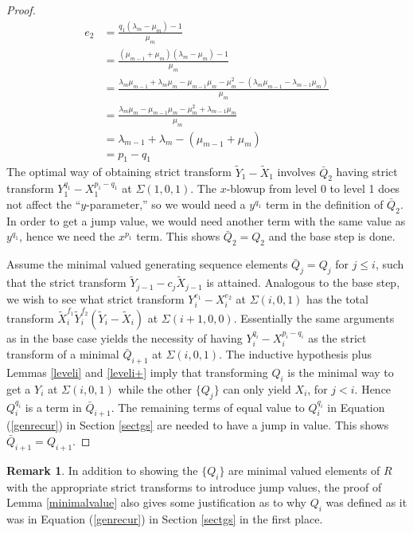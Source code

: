 \documentclass[11pt]{amsart}
\theoremstyle{definition}
\newtheorem*{rem}{Remark}
\begin{document}
{\begin{proof}
\begin{equation*}
\begin{array}{rl}
e_2 & \displaystyle =\frac{q_1(\lambda_m-\mu_m)-1}{\mu_m} \\
& \displaystyle = \frac{(\mu_{m-1}+\mu_m)(\lambda_m-\mu_m)-1}{\mu_m} \\
& \displaystyle = \frac{\lambda_m\mu_{m-1}+\lambda_m\mu_m-\mu_{m-1}\mu_m-\mu_m^2-(\lambda_m\mu_{m-1}-\lambda_{m-1}\mu_m)}{\mu_m} \\
& \displaystyle = \frac{\lambda_m\mu_m-\mu_{m-1}\mu_m-\mu_m^2+\lambda_{m-1}\mu_m}{\mu_m} \\
& \displaystyle = \lambda_{m-1}+\lambda_m - (\mu_{m-1}+\mu_m) \\
& \displaystyle = p_1 - q_1
\end{array}
\end{equation*}
The optimal way of obtaining strict transform $\tilde Y_1-\tilde X_1$ involves $\bar Q_2$ having strict transform $Y_1^{q_1}-X_1^{p_1-q_1}$ at $\Sigma(1,0,1)$. The $x$-blowup from level 0 to level 1 does not affect the ``$y$-parameter,'' so we would need a $y^{q_1}$ term in the definition of $\bar Q_2$. In order to get a jump value, we would need another term with the same value as $y^{q_1}$, hence we need the $x^{p_1}$ term. This shows $\bar Q_2=Q_2$ and the base step is done.

Assume the minimal valued generating sequence elements $\bar Q_j=Q_j$ for $j\leq i$, such that the strict transform $\tilde Y_{j-1}-c_j\tilde X_{j-1}$ is attained. Analogous to the base step, we wish to see what strict transform $Y_i^{e_1}-X_i^{e_2}$ at $\Sigma(i,0,1)$ has the total transform $\tilde X_i^{f_1}\tilde Y_i^{f_2}\left(\tilde Y_i - \tilde X_i\right)$ at $\Sigma(i+1,0,0)$. Essentially the same arguments as in the base case yields the necessity of having $Y_i^{q_i}-X_i^{p_i-q_i}$ as the strict transform of a minimal $\bar Q_{i+1}$ at $\Sigma(i,0,1)$. The inductive hypothesis plus Lemmas \ref{leveli} and \ref{leveli+} imply that transforming $Q_i$ is the minimal way to get a $Y_i$ at $\Sigma(i,0,1)$ while the other $\{Q_j\}$ can only yield $X_i$, for $j<i$. Hence $Q_i^{q_i}$ is a term in $\bar Q_{i+1}$. The remaining terms of equal value to $Q_i^{q_i}$ in Equation (\ref{genrecur}) in Section \ref{sectgs} are needed to have a jump in value. This shows $\bar Q_{i+1}=Q_{i+1}$.
\end{proof}

\begin{rem}
In addition to showing the $\{Q_i\}$ are minimal valued elements of $R$ with the appropriate strict transforms to introduce jump values, the proof of Lemma \ref{minimalvalue} also gives some justification as to why $Q_i$ was defined as it was in Equation (\ref{genrecur}) in Section \ref{sectgs} in the first place.
\end{rem}

}
\end{document}
